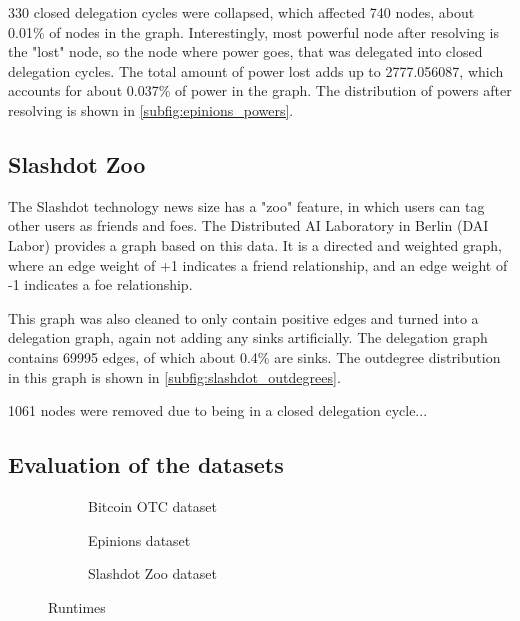 330 closed delegation cycles were collapsed, which affected 740 nodes, about 0.01\% of nodes in the graph. Interestingly, most powerful node after resolving is the "lost" node, so the node where power goes, that was delegated into closed delegation cycles. The total amount of power lost adds up to 2777.056087, which accounts for about 0.037\% of power in the graph. The distribution of powers after resolving is shown in \cref{subfig:epinions_powers}.

\subsection{Slashdot Zoo}

The Slashdot technology news size has a "zoo" feature, in which users can tag other users as friends and foes. The Distributed AI Laboratory in Berlin (DAI Labor) provides a graph based on this data. \cite{kunegis2009a} It is a directed and weighted graph, where an edge weight of +1 indicates a friend relationship, and an edge weight of -1 indicates a foe relationship.

This graph was also cleaned to only contain positive edges and turned into a delegation graph, again not adding any sinks artificially. The delegation graph contains 69995 edges, of which about 0.4\% are sinks. The outdegree distribution in this graph is shown in \cref{subfig:slashdot_outdegrees}.

1061 nodes were removed due to being in a closed delegation cycle...
 
 \subsection{Evaluation of the datasets}
 \label{subsec:datasets_eval}
 
\begin{figure}[t]
    \centering
        \begin{subfigure}[t]{0.30\textwidth}
        \caption{Bitcoin OTC dataset}
    \end{subfigure}
    \hfill
        \begin{subfigure}[t]{0.30\textwidth}
        \caption{Epinions dataset}
    \end{subfigure}
    \hfill
    \begin{subfigure}[t]{0.30\textwidth}
    	\centering
    	\caption{Slashdot Zoo dataset}
    \end{subfigure}
    \caption{Runtimes}
    \label{fig:datasets_runtimes}
\end{figure}

